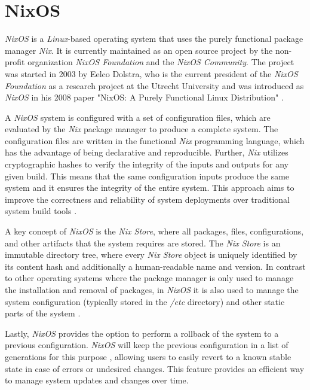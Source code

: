 \section{NixOS}
\textit{NixOS} is a \textit{Linux}-based operating system that uses the purely
functional package manager \textit{Nix}. It is currently maintained as
an open source project by the non-profit organization \textit{NixOS Foundation}
and the \textit{NixOS Community}. The project was started in 2003 by Eelco Dolstra,
who is the current president of the \textit{NixOS Foundation} as
a research project at the Utrecht University \cite{dolstra2003} and was introduced
as \textit{NixOS} in his 2008 paper "NixOS: A Purely Functional Linux Distribution"
\cite{dolstra2008}.

A \textit{NixOS} system is configured with a set of configuration files, which
are evaluated by the \textit{Nix} package manager to produce a complete system.
The configuration files are written in the functional \textit{Nix} programming language,
which has the advantage of being declarative and reproducible. Further, \textit{Nix}
utilizes cryptographic hashes to verify the integrity of the inputs and outputs
for any given build. This means that the same configuration inputs produce the
same system and it ensures the integrity of the entire system. This approach
aims to improve the correctness and reliability of
system deployments over traditional system build tools \cite{dolstra2006}.

A key concept of \textit{NixOS} is the \textit{Nix Store}, where all packages,
files, configurations, and other artifacts that the system requires are stored.
The \textit{Nix Store} is an immutable directory tree, where every \textit{Nix Store}
object is uniquely identified by its content hash and additionally a
human-readable name and version. In contrast to other operating systems where the package
manager is only used to manage the installation and removal of packages, in \textit{NixOS}
it is also used to manage the system configuration (typically stored in the
\textit{/etc} directory) and other static parts of the
system \cite{1411255}.

Lastly, \textit{NixOS} provides the option to perform a rollback of the system to a
previous configuration. \textit{NixOS} will keep the previous configuration
in a list of generations for this purpose \cite{1411255}, allowing users to easily
revert to a known stable state in case of errors or undesired changes. This
feature provides an efficient way to manage system updates and changes over time.

